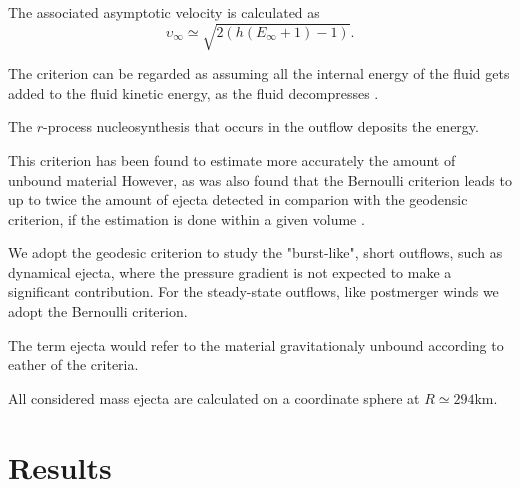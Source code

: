 The associated asymptotic velocity is calculated as 
\begin{equation}
\upsilon_{\infty} \simeq \sqrt{2 (h (E_{\infty}+1)-1)}. 
\end{equation}

The criterion can be regarded as assuming all the internal energy of the fluid 
gets added to the fluid kinetic energy, as the fluid decompresses .

The $r$-process nucleosynthesis that occurs in the outflow deposits the energy.

This criterion has been found to estimate more accurately the amount of unbound material \citep{Foucart:2015gaa}
However, as was also found that the Bernoulli criterion leads to up to twice the amount of ejecta detected in comparion with the geodensic criterion, if the estimation is done within a given volume \citep{Kastaun:2014fna}.

We adopt the geodesic criterion to study the "burst-like", short outflows,
such as dynamical ejecta, where the pressure gradient is not expected to make a significant contribution.
For the steady-state outflows, like postmerger winds we adopt the Bernoulli criterion.

The term ejecta would refer to the material gravitationaly unbound according to eather of the criteria.




All considered mass ejecta are calculated on a coordinate sphere at $R \simeq 294$km. 






\section{Results}



